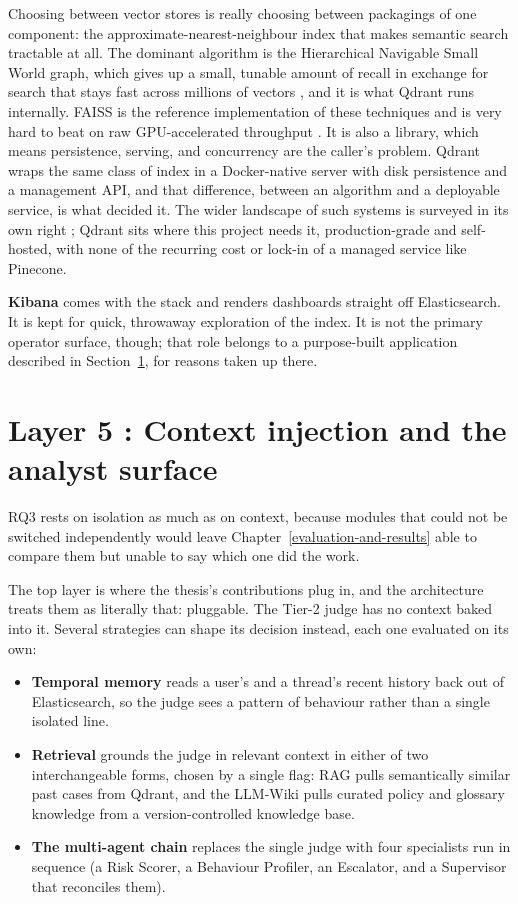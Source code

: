 Choosing between vector stores is really choosing between packagings of one component: the approximate-nearest-neighbour index that makes semantic search tractable at all. The dominant algorithm is the Hierarchical Navigable Small World graph, which gives up a small, tunable amount of recall in exchange for search that stays fast across millions of vectors \citep{hnsw2020}, and it is what Qdrant runs internally. FAISS is the reference implementation of these techniques and is very hard to beat on raw GPU-accelerated throughput \citep{faiss2021}. It is also a library, which means persistence, serving, and concurrency are the caller's problem. Qdrant wraps the same class of index in a Docker-native server with disk persistence and a management API, and that difference, between an algorithm and a deployable service, is what decided it. The wider landscape of such systems is surveyed in its own right \citep{vecdbsurvey2024}; Qdrant sits where this project needs it, production-grade and self-hosted, with none of the recurring cost or lock-in of a managed service like Pinecone.

\textbf{Kibana} comes with the stack and renders dashboards straight off Elasticsearch. It is kept for quick, throwaway exploration of the index. It is not the primary operator surface, though; that role belongs to a purpose-built application described in Section~\ref{layer-5-context-injection-and-the-analyst-surface}, for reasons taken up there.

\section{Layer 5 : Context injection and the analyst surface}\label{layer-5-context-injection-and-the-analyst-surface}

RQ3 rests on isolation as much as on context, because modules that could not be switched independently would leave Chapter~\ref{evaluation-and-results} able to compare them but unable to say which one did the work.

The top layer is where the thesis's contributions plug in, and the architecture treats them as literally that: pluggable. The Tier-2 judge has no context baked into it. Several strategies can shape its decision instead, each one evaluated on its own:

\begin{itemize}
\tightlist
\item \textbf{Temporal memory} reads a user's and a thread's recent history back out of Elasticsearch, so the judge sees a pattern of behaviour rather than a single isolated line.
\item \textbf{Retrieval} grounds the judge in relevant context in either of two interchangeable forms, chosen by a single flag: RAG pulls semantically similar past cases from Qdrant, and the LLM-Wiki pulls curated policy and glossary knowledge from a version-controlled knowledge base.
\item \textbf{The multi-agent chain} replaces the single judge with four specialists run in sequence (a Risk Scorer, a Behaviour Profiler, an Escalator, and a Supervisor that reconciles them).
\end{itemize}

